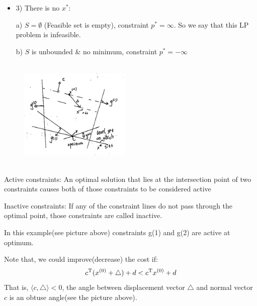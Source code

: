 \begin{example}
\begin{itemize}
		\item 3) There is no $x^*$:
		
		\quad a) $S = \emptyset$ (Feasible set is empty), constraint $p^* = \infty$. So we say that this LP problem is infeasible.
		
		\quad b) $S$ is unbounded \& no minimum, constraint $p^* = -\infty$
	\end{itemize}
	
	
	\begin{figure}
		\centering
		\includegraphics[width=2.1in,height=2.1in]{figures/ch07/figure1012_8.png}
	\end{figure}
	
	Active constraints: An optimal solution that lies at the intersection point of two constraints causes both of those constraints to be considered active
	
	Inactive constraints: If any of the constraint lines do not pass through the optimal point, those constraints are called inactive.
	
	In this example(see picture above) constraints g(1) and g(2) are active at optimum.
	
	Note that, we could improve(decrease) the cost if:
	$$c^{{\rm T}}(x^{(0)} + \bigtriangleup) + d < c^{{\rm T}}x^{(0)} + d$$
	That is, $\langle c, \bigtriangleup\rangle < 0$, the angle between displacement vector $\bigtriangleup$ and normal vector $c$ is an obtuse angle(see the picture above).
\end{example}





